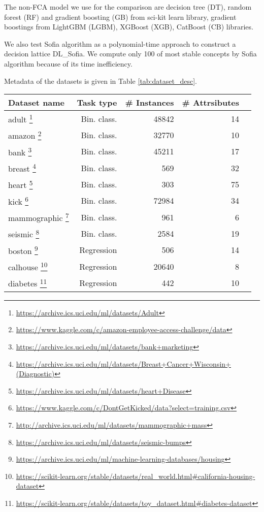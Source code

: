 \documentclass[runningheads]{llncs}
\begin{document}
The non-FCA model we use for the comparison are decision tree (DT), random forest (RF) and gradient boosting (GB) from sci-kit learn library, gradient boostings from LightGBM (LGBM), XGBoost (XGB), CatBoost (CB) libraries. 

We also test Sofia algorithm \cite{Sofia} as a polynomial-time approach to construct a decision lattice DL\_Sofia. 
We compute only 100 of most stable concepts by Sofia algorithm because of its time inefficiency.

Metadata of the datasets is given in Table \ref{tab:dataset_desc}.

\begin{savenotes}
\begin{table}[]
\parbox{.25\linewidth}{
    \centering
    \tabcolsep=0.06cm
     \fontsize{6}{8}\selectfont
\begin{tabular}{l|rrrr}
Dataset name & Task type &  \# Instances & \# Attrsibutes\\
\hline
adult \footnote{\url{https://archive.ics.uci.edu/ml/datasets/Adult}} & Bin. class. & 48842 & 14\\
amazon \footnote{\url{https://www.kaggle.com/c/amazon-employee-access-challenge/data}} & Bin. class. & 32770 & 10\\
bank \footnote{\url{https://archive.ics.uci.edu/ml/datasets/bank+marketing}} & Bin. class. & 45211 & 17 \\
breast \footnote{\url{https://archive.ics.uci.edu/ml/datasets/Breast+Cancer+Wisconsin+(Diagnostic)}} & Bin. class. & 569  & 32 \\
heart \footnote{\url{https://archive.ics.uci.edu/ml/datasets/heart+Disease}} & Bin. class. & 303 & 75 \\
kick \footnote{\url{https://www.kaggle.com/c/DontGetKicked/data?select=training.csv}} & Bin. class. & 72984 & 34\\
mammographic \footnote{\url{http://archive.ics.uci.edu/ml/datasets/mammographic+mass}} & Bin. class. & 961 & 6 \\
seismic \footnote{\url{https://archive.ics.uci.edu/ml/datasets/seismic-bumps}} & Bin. class. & 2584 & 19\\
\hline
boston \footnote{\url{https://archive.ics.uci.edu/ml/machine-learning-databases/housing}} & Regression & 506  & 14\\
calhouse \footnote{\url{https://scikit-learn.org/stable/datasets/real_world.html\#california-housing-dataset}} & Regression & 20640 & 8\\
diabetes \footnote{\url{https://scikit-learn.org/stable/datasets/toy_dataset.html\#diabetes-dataset}} & Regression & 442  & 10 \\


\end{tabular}}
\end{table}
\end{savenotes}
\end{document}

